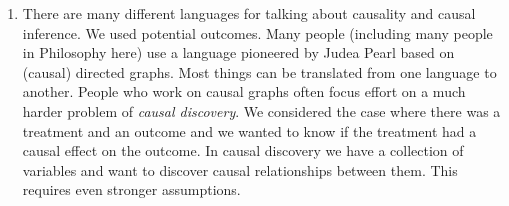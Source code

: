 \documentclass[twoside,12pt]{article}
\begin{document}
\begin{enumerate}
\item There are many different languages for talking about causality and causal inference. We used potential outcomes. Many people (including many people in Philosophy here) use a language pioneered by Judea Pearl based on (causal) directed graphs. Most things can be translated from one language to another. People who work on causal graphs often focus effort on a much harder problem of \emph{causal discovery}. We considered the case where there was a treatment and an outcome and we wanted to know if the treatment had a causal effect on the outcome. In causal discovery we have a 
collection of variables and want to discover causal relationships between them. This requires even stronger assumptions.

\end{enumerate}
\end{document}
